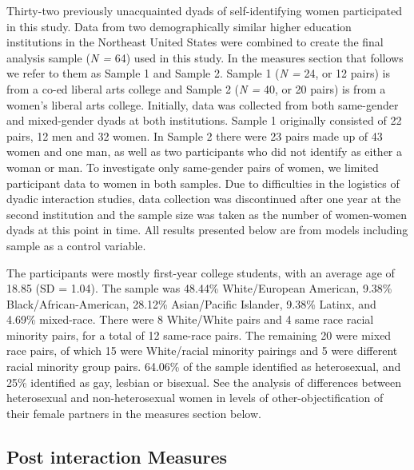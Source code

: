 \documentclass[man]{apa6}
\begin{document}
Thirty-two previously unacquainted dyads of self-identifying women
participated in this study. Data from two demographically similar higher
education institutions in the Northeast United States were combined to
create the final analysis sample (\emph{N =} 64) used in this study. In
the measures section that follows we refer to them as Sample 1 and
Sample 2. Sample 1 (\emph{N =} 24, or 12 pairs) is from a co-ed liberal
arts college and Sample 2 (\emph{N =} 40, or 20 pairs) is from a women's
liberal arts college. Initially, data was collected from both
same-gender and mixed-gender dyads at both institutions. Sample 1
originally consisted of 22 pairs, 12 men and 32 women. In Sample 2 there
were 23 pairs made up of 43 women and one man, as well as two
participants who did not identify as either a woman or man. To
investigate only same-gender pairs of women, we limited participant data
to women in both samples. Due to difficulties in the logistics of dyadic
interaction studies, data collection was discontinued after one year at
the second institution and the sample size was taken as the number of
women-women dyads at this point in time. All results presented below are
from models including sample as a control variable.

The participants were mostly first-year college students, with an
average age of 18.85 (SD = 1.04). The sample was 48.44\% White/European
American, 9.38\% Black/African-American, 28.12\% Asian/Pacific Islander,
9.38\% Latinx, and 4.69\% mixed-race. There were 8 White/White pairs and
4 same race racial minority pairs, for a total of 12 same-race pairs.
The remaining 20 were mixed race pairs, of which 15 were White/racial
minority pairings and 5 were different racial minority group pairs.
64.06\% of the sample identified as heterosexual, and 25\% identified as
gay, lesbian or bisexual. See the analysis of differences between
heterosexual and non-heterosexual women in levels of
other-objectification of their female partners in the measures section
below.

\subsection{Post interaction Measures}\label{post-interaction-measures}
\end{document}
